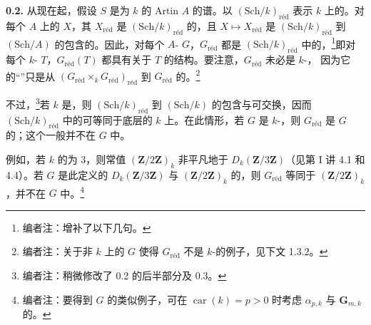\textbf{0.2.} 从现在起，假设 $S$ 是为 $k$ 的 Artin  $A$ 的谱。以 $(\mathrm{Sch}/k)_{\mathrm{r\text{é}d}}$ 表示 $k$ 上的。对每个 $A$ 上的 $X$，其 $X_{\mathrm{r\text{é}d}}$ 是 $(\mathrm{Sch}/k)_{\mathrm{r\text{é}d}}$ 的，且 $X\mapsto X_{\mathrm{r\text{é}d}}$ 是 $(\mathrm{Sch}/k)_{\mathrm{r\text{é}d}}$ 到 $(\mathrm{Sch}/A)$ 的包含的。因此，对每个 $A$- $G$，$G_{\mathrm{r\text{é}d}}$ 都是 $(\mathrm{Sch}/k)_{\mathrm{r\text{é}d}}$ 中的，\footnote{编者注：增补了以下几句。}即对每个 $k$- $T$，$G_{\mathrm{r\text{é}d}}(T)$ 都具有关于 $T$ 的结构。要注意，$G_{\mathrm{r\text{é}d}}$ 未必是 $k$-，
因为它的“”只是从 $(G_{\mathrm{r\text{é}d}}\times_k G_{\mathrm{r\text{é}d}})_{\mathrm{r\text{é}d}}$ 到 $G_{\mathrm{r\text{é}d}}$ 的。\footnote{编者注：关于非 $k$ 上的 $G$ 使得 $G_{\mathrm{r\text{é}d}}$ 不是 $k$-的例子，见下文 1.3.2。}

不过，\footnote{编者注：稍微修改了 0.2 的后半部分及 0.3。}若 $k$ 是，则 $(\mathrm{Sch}/k)_{\mathrm{r\text{é}d}}$ 到 $(\mathrm{Sch}/k)$ 的包含与可交换，因而 $(\mathrm{Sch}/k)_{\mathrm{r\text{é}d}}$ 中的可等同于底层的 $k$ 上。在此情形，若 $G$ 是 $k$-，则 $G_{\mathrm{r\text{é}d}}$ 是 $G$ 的；这个一般并不在 $G$ 中。

例如，若 $k$ 的为 $3$，则常值 $(\mathbf Z/2\mathbf Z)_k$ 非平凡地于 $D_k(\mathbf Z/3\mathbf Z)$（见第 I 讲 4.1 和 4.4）。若 $G$ 是此定义的 $D_k(\mathbf Z/3\mathbf Z)$ 与 $(\mathbf Z/2\mathbf Z)_k$ 的，则 $G_{\mathrm{r\text{é}d}}$ 等同于 $(\mathbf Z/2\mathbf Z)_k$，并不在 $G$ 中。\footnote{编者注：要得到 $G$ 的类似例子，可在 $\operatorname{car}(k)=p>0$ 时考虑 $\alpha_{p,k}$ 与 $\mathbf G_{m,k}$ 的。}

